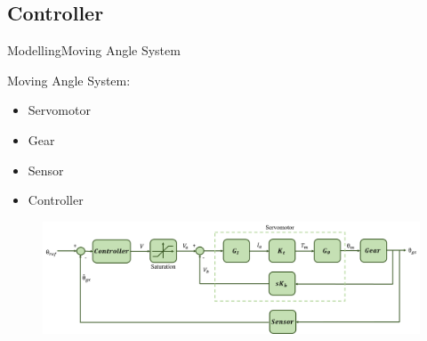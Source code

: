 \subsection{Controller}
%
%
%
%  
%
%
%
%

\begin{frame}{Modelling}{Moving Angle System}
  \begin{block}{Moving Angle System:}

	  \begin{itemize}
  	  	\item Servomotor
	  	\item Gear
	  	\item Sensor
	  	\item Controller
	  \end{itemize}

	  \begin{figure}
        \includegraphics[scale=0.26]{../report/figures/complete_model.png}
      \end{figure}
  
  \end{block}
\end{frame}


